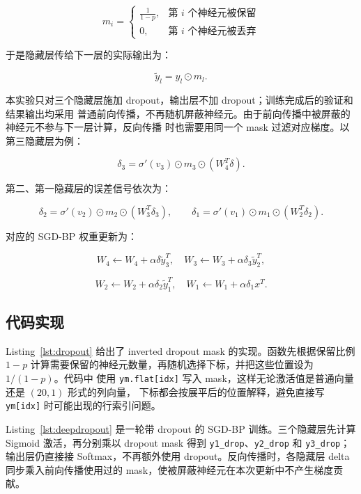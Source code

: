 \documentclass[10.5pt]{config}
\newcommand{\codeinput}[5]{%
}
\begin{document}
\[
m_i=
\begin{cases}
\frac{1}{1-p}, & \text{第 } i \text{ 个神经元被保留}\\
0, & \text{第 } i \text{ 个神经元被丢弃}
\end{cases}
\]

于是隐藏层传给下一层的实际输出为：

\[
\tilde y_l=y_l\odot m_l.
\]

本实验只对三个隐藏层施加 dropout，输出层不加 dropout；训练完成后的验证和结果输出均采用
普通前向传播，不再随机屏蔽神经元。由于前向传播中被屏蔽的神经元不参与下一层计算，反向传播
时也需要用同一个 mask 过滤对应梯度。以第三隐藏层为例：

\[
\delta_3=\sigma'(v_3)\odot m_3\odot (W_4^T\delta).
\]

第二、第一隐藏层的误差信号依次为：

\[
\delta_2=\sigma'(v_2)\odot m_2\odot (W_3^T\delta_3),\qquad
\delta_1=\sigma'(v_1)\odot m_1\odot (W_2^T\delta_2).
\]

对应的 SGD-BP 权重更新为：

\[
W_4\leftarrow W_4+\alpha\delta \tilde y_3^T,\quad
W_3\leftarrow W_3+\alpha\delta_3 \tilde y_2^T,
\]

\[
W_2\leftarrow W_2+\alpha\delta_2 \tilde y_1^T,\quad
W_1\leftarrow W_1+\alpha\delta_1 x^T.
\]

\subsection{代码实现}

Listing~\ref{lst:dropout} 给出了 inverted dropout mask 的实现。函数先根据保留比例
$1-p$ 计算需要保留的神经元数量，再随机选择下标，并把这些位置设为 $1/(1-p)$。代码中
使用 \texttt{ym.flat[idx]} 写入 mask，这样无论激活值是普通向量还是 $(20,1)$ 形式的列向量，
下标都会按展平后的位置解释，避免直接写 \texttt{ym[idx]} 时可能出现的行索引问题。

\codeinput{../Code/EXP6/Dropout.py}{lst:dropout}{Dropout.py：Dropout mask生成函数}{1}{13}

Listing~\ref{lst:deepdropout} 是一轮带 dropout 的 SGD-BP 训练。三个隐藏层先计算 Sigmoid
激活，再分别乘以 dropout mask 得到 \texttt{y1\_drop}、\texttt{y2\_drop} 和
\texttt{y3\_drop}；输出层仍直接接 Softmax，不再额外使用 dropout。反向传播时，各隐藏层
delta 同步乘入前向传播使用过的 mask，使被屏蔽神经元在本次更新中不产生梯度贡献。

\codeinput{../Code/EXP6/DeepDropout.py}{lst:deepdropout}{DeepDropout.py：Sigmoid隐藏层与Dropout训练函数}{1}{55}
\end{document}
